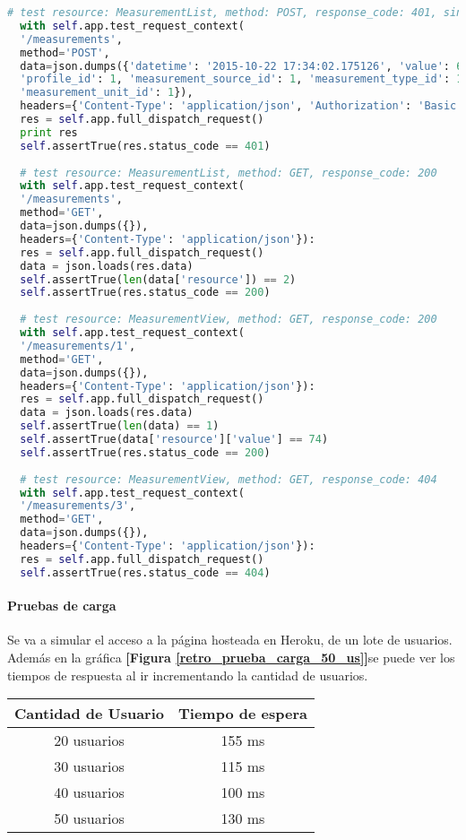 \begin{lstlisting}[language=Python ]
  # test resource: MeasurementList, method: POST, response_code: 401, sin autorizacion, token invalido
  with self.app.test_request_context(
  '/measurements',
  method='POST',
  data=json.dumps({'datetime': '2015-10-22 17:34:02.175126', 'value': 68, 'analysis_id': 1,
  'profile_id': 1, 'measurement_source_id': 1, 'measurement_type_id': 1,
  'measurement_unit_id': 1}),
  headers={'Content-Type': 'application/json', 'Authorization': 'Basic ' + token_a}):
  res = self.app.full_dispatch_request()
  print res
  self.assertTrue(res.status_code == 401)
  
  # test resource: MeasurementList, method: GET, response_code: 200
  with self.app.test_request_context(
  '/measurements',
  method='GET',
  data=json.dumps({}),
  headers={'Content-Type': 'application/json'}):
  res = self.app.full_dispatch_request()
  data = json.loads(res.data)
  self.assertTrue(len(data['resource']) == 2)
  self.assertTrue(res.status_code == 200)
  
  # test resource: MeasurementView, method: GET, response_code: 200
  with self.app.test_request_context(
  '/measurements/1',
  method='GET',
  data=json.dumps({}),
  headers={'Content-Type': 'application/json'}):
  res = self.app.full_dispatch_request()
  data = json.loads(res.data)
  self.assertTrue(len(data) == 1)
  self.assertTrue(data['resource']['value'] == 74)
  self.assertTrue(res.status_code == 200)
  
  # test resource: MeasurementView, method: GET, response_code: 404
  with self.app.test_request_context(
  '/measurements/3',
  method='GET',
  data=json.dumps({}),
  headers={'Content-Type': 'application/json'}):
  res = self.app.full_dispatch_request()
  self.assertTrue(res.status_code == 404)
  \end{lstlisting}
  
  \paragraph{Pruebas de carga}
  Se va a simular el acceso a la página hosteada en Heroku, de un lote de usuarios. Además en la gráfica \textbf{[Figura \ref{retro_prueba_carga_50_us}]}se puede ver los tiempos de respuesta al ir incrementando la cantidad de usuarios.
  
  \begin{center}
  	\begin{tabular}{|c|c|}
  		\hline Cantidad de Usuario  &  Tiempo de espera\\ 
  		\hline 20 usuarios &  155 ms \\ 
  		\hline 30 usuarios  & 115 ms \\ 
  		\hline 40 usuarios  & 100 ms \\ 
  		\hline 50 usuarios  & 130 ms \\ 	
  		\hline 
  	\end{tabular} 
  \end{center}
  
